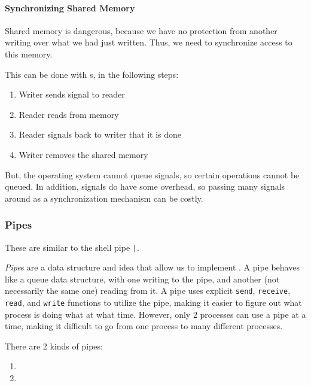 \paragraph{Synchronizing Shared Memory}\label{par:Syncing_Shared_Memory}
Shared memory is dangerous, because we have no protection from another  writing over what we had just written.
Thus, we need to synchronize access to this memory.

This can be done with s, in the following steps:
\begin{enumerate}[noitemsep]
\item Writer sends signal to reader
\item Reader reads from memory
\item Reader signals back to writer that it is done
\item Writer removes the shared memory
\end{enumerate}

But, the operating system cannot queue signals, so certain operations cannot be queued.
In addition, signals do have some overhead, so passing many signals around as a synchronization mechanism can be costly.

\subsubsection{Pipes}\label{subsubsec:IPC_Mechanism-Pipes}
These are similar to the shell pipe \texttt{|}.

\begin{definition}[Pipe]\label{def:Pipe}
  \emph{Pipe}s are a data structure and idea that allow us to implement .
  A pipe behaves like a queue data structure, with one  writing to the pipe, and another (not necessarily the same one) reading from it.
  A pipe uses explicit \texttt{send}, \texttt{receive}, \texttt{read}, and \texttt{write} functions to utilize the pipe, making it easier to figure out what process is doing what at what time.
  However, only 2 processes can use a pipe at a time, making it difficult to go from one process to many different processes.

  There are 2 kinds of pipes:
  \begin{enumerate}[noitemsep]
  \item {}
  \item {}
  \end{enumerate}
\end{definition}

